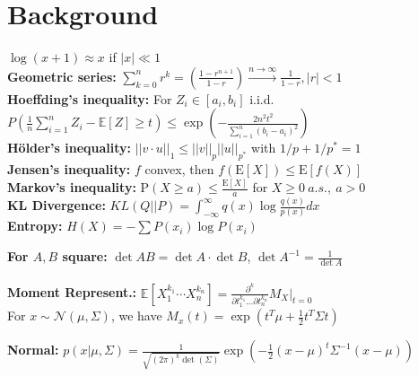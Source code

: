 \section*{Background}
$\log(x+1)\approx x$ if $|x|\ll 1$ \\
\textbf{Geometric series:} $\sum_{k=0}^nr^k=(\frac{1-r^{n+1}}{1-r})\overset{n\rightarrow\infty}{\longrightarrow}\frac{1}{1-r},$\hfill $ |r|<1$\\
\textbf{Hoeffding's inequality: } For $Z_i \in [a_i,b_i]$ i.i.d.\\ $P(\frac{1}{n}\sum_{i=1}^n Z_i - \mathbb E[Z]\geq t)\leq \exp(-\frac{2n^2t^2}{\sum_{i=1}^n(b_i -a_i)^2})$\\
\textbf{Hölder's inequality:} $||v \cdot u||_1\leq||v||_{p}||u||_{p^*}$ with $1/p+1/p^*\!=\!1$\\
\textbf{Jensen's inequality:} $f$ convex, then $f(\mathrm E[X])\leq\mathrm E[f(X)]$\\
\textbf{Markov's inequality:} $\mathrm P(X\geq a)\leq\frac{\mathrm E[X]}{a}$ for $X \geq 0\ a.s.,\ a > 0$\\
\textbf{KL Divergence:} $KL(Q || P) = \int_{-\infty}^{\infty} q(x)\log \frac{q(x)}{p(x)}dx$\\
\textbf{Entropy:} $H(X) = - \sum P(x_i)\log P(x_i) $

\textbf{For $A,B$ square:} $\det AB = \det A \cdot \det B$, $\det A^{-1} = \frac{1}{\det A }$\\
\\
\textbf{Moment Represent.:} $\mathbb E [X_1^{k_1} \cdots X_n^{k_n} ] = \frac{\partial^k}{\partial t_1^{k_1} \ldots \partial t_n^{k_n}} M_X \vert_{t=0}$\\
For $x \sim \mathcal{N}(\mu, \Sigma)$, we have $M_x(t) = \exp(t^T\mu + \frac{1}{2}t^T\Sigma t)$


\textbf{Normal:}
$p(x|\mu, \Sigma) = \frac{1}{\sqrt{(2\pi)^k\det(\Sigma)}} \exp(-\frac{1}{2}(x-\mu)^t\Sigma^{-1}(x-\mu))$\\
\\ 

